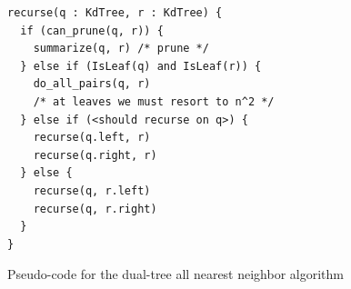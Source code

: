 \documentclass[12pt,letterpaper,doublespaced,ETD,dvips,proposal]{gtthesis}
\begin{document}
\begin{Body}
%

\begin{figure}[!htb]
\begin{boxedminipage}[c]{\linewidth}
\begin{verbatim}
recurse(q : KdTree, r : KdTree) {
  if (can_prune(q, r)) {
    summarize(q, r) /* prune */
  } else if (IsLeaf(q) and IsLeaf(r)) {
    do_all_pairs(q, r)
    /* at leaves we must resort to n^2 */
  } else if (<should recurse on q>) {
    recurse(q.left, r)
    recurse(q.right, r)
  } else {
    recurse(q, r.left)
    recurse(q, r.right)
  }
}
\end{verbatim}
\end{boxedminipage}
\caption{Pseudo-code for the dual-tree all nearest neighbor
algorithm} \label{dualtree_algorithm}
\end{figure}



\end{Body}
\end{document}
